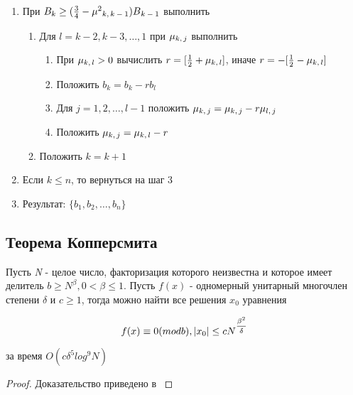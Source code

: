\begin{enumerate}
     \item При {$ B_k \ge (\frac{3}{4} - \mu^2\textsubscript{{$k,k-1$}})B\textsubscript{{$k-1$}} $} выполнить
     
      \begin{enumerate}
       \item Для {$l=k-2,k-3,\dots,1$} при {$\mu\textsubscript{{$k,j$}}$} выполнить
       
	\begin{enumerate}
	  \item При {$ \mu\textsubscript{{$k,l$}} > 0 $} вычислить {$r=[\frac{1}{2} + \mu\textsubscript{{$k,l$}}]$}, иначе {$r=-[\frac{1}{2} - \mu\textsubscript{{$k,l$}}]$}
	  \item Положить {$b_k=b_k - r b_l$}   
	  \item Для {$j = 1, 2, \dots, l - 1$} положить {$\mu\textsubscript{{$k,j$}} = \mu\textsubscript{{$k,j$}} - r \mu\textsubscript{{$l,j$}}$}
	  \item Положить {$\mu\textsubscript{{$k,j$}} = \mu\textsubscript{{$k,l$}} - r$}
	\end{enumerate}
       
       \item  Положить {$k=k+1$}   
      \end{enumerate}
     
     \item Если {$k \le n$}, то вернуться на шаг 3
     \item Результат: {$\{ b_1,b_2, \dots, b_n \}$}
    \end{enumerate}


\subsection{Теорема Копперсмита}

  \begin{theorem}
   Пусть \textit{N} - целое число, факторизация которого неизвестна и которое имеет делитель {$b \ge N^\beta, 0 < \beta \le 1$}. Пусть {$f(x)$} - одномерный унитарный
   многочлен степени {$\delta$} и {$c \ge 1$}, тогда можно найти все решения {$x_0$} уравнения
   
    \begin{equation}
     \textit{{$ f(x) \equiv 0(mod b), |x_0| \le c N\textsuperscript{{$\frac{\beta^2}{\delta}$}} $}}
    \end{equation}

    за время {$O(c \delta^5 log^9 N)$}
    
    \begin{proof}
     Доказательство приведено в \cite[страницы 320-350]{may10}
    \end{proof}

  \end{theorem}
  
